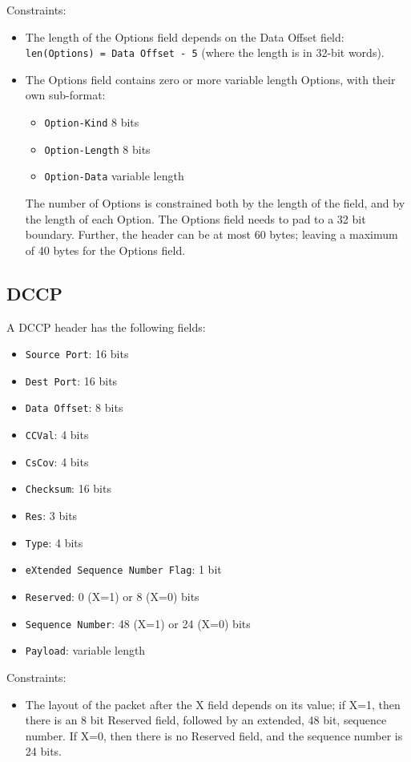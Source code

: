 \documentclass[10pt]{article}
\begin{document}
Constraints:
\begin{itemize}
\item The length of the Options field depends on the Data Offset field:
\texttt{len(Options) = Data Offset - 5} (where the length is in 32-bit words).
\item The Options field contains zero or more variable length Options, with their own
sub-format:
\begin{itemize}
\item \texttt{Option-Kind} 8 bits
\item \texttt{Option-Length} 8 bits
\item \texttt{Option-Data} variable length
\end{itemize}
The number of Options is constrained both by the length of the field, and by the length
of each Option. The Options field needs to pad to a 32 bit boundary. Further, the header
can be at most 60 bytes; leaving a maximum of 40 bytes for the Options field.
\end{itemize}

\subsection{DCCP}

A DCCP header has the following fields:
\begin{itemize}
\item \texttt{Source Port}: 16 bits
\item \texttt{Dest Port}: 16 bits
\item \texttt{Data Offset}: 8 bits
\item \texttt{CCVal}: 4 bits
\item \texttt{CsCov}: 4 bits
\item \texttt{Checksum}: 16 bits
\item \texttt{Res}: 3 bits
\item \texttt{Type}: 4 bits
\item \texttt{eXtended Sequence Number Flag}: 1 bit
\item \texttt{Reserved}: 0 (X=1) or 8 (X=0) bits
\item \texttt{Sequence Number}: 48 (X=1) or 24 (X=0) bits
\item \texttt{Payload}: variable length
\end{itemize}

Constraints:
\begin{itemize}
\item The layout of the packet after the X field depends on its value; if X=1, then there
is an 8 bit Reserved field, followed by an extended, 48 bit, sequence number. If X=0, then
there is no Reserved field, and the sequence number is 24 bits.
\end{itemize}
\end{document}

